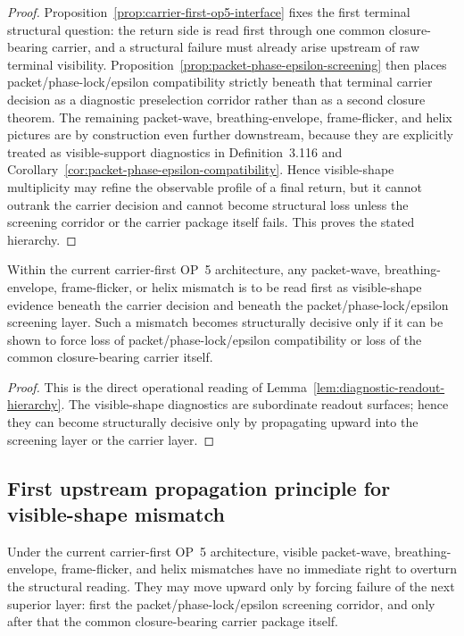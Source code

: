 \begin{proof}
Proposition~\ref{prop:carrier-first-op5-interface} fixes the first terminal structural question: the return side is read first through one common closure-bearing carrier, and a structural failure must already arise upstream of raw terminal visibility. Proposition~\ref{prop:packet-phase-epsilon-screening} then places packet/phase-lock/epsilon compatibility strictly beneath that terminal carrier decision as a diagnostic preselection corridor rather than as a second closure theorem. The remaining packet-wave, breathing-envelope, frame-flicker, and helix pictures are by construction even further downstream, because they are explicitly treated as visible-support diagnostics in Definition~3.116 and Corollary~\ref{cor:packet-phase-epsilon-compatibility}. Hence visible-shape multiplicity may refine the observable profile of a final return, but it cannot outrank the carrier decision and cannot become structural loss unless the screening corridor or the carrier package itself fails. This proves the stated hierarchy.
\end{proof}

\begin{corollary}
\label{cor:flicker-helix-subordination}
Within the current carrier-first OP~5 architecture, any packet-wave, breathing-envelope, frame-flicker, or helix mismatch is to be read first as visible-shape evidence beneath the carrier decision and beneath the packet/phase-lock/epsilon screening layer. Such a mismatch becomes structurally decisive only if it can be shown to force loss of packet/phase-lock/epsilon compatibility or loss of the common closure-bearing carrier itself.
\end{corollary}

\begin{proof}
This is the direct operational reading of Lemma~\ref{lem:diagnostic-readout-hierarchy}. The visible-shape diagnostics are subordinate readout surfaces; hence they can become structurally decisive only by propagating upward into the screening layer or the carrier layer.
\end{proof}

\subsection{First upstream propagation principle for visible-shape mismatch}
\label{sec:first-upstream-propagation}

\begin{remark}
Under the current carrier-first OP~5 architecture, visible packet-wave, breathing-envelope, frame-flicker, and helix mismatches have no immediate right to overturn the structural reading. They may move upward only by forcing failure of the next superior layer: first the packet/phase-lock/epsilon screening corridor, and only after that the common closure-bearing carrier package itself.
\end{remark}

